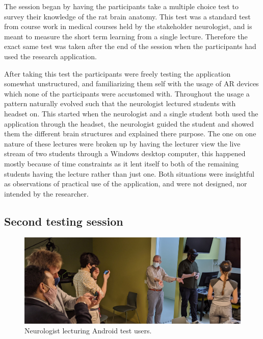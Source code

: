 The session began by having the participants take a multiple choice test to survey their knowledge of the rat brain anatomy. This test was a standard test from course work in medical courses held by the stakeholder neurologist, and is meant to measure the short term learning from a single lecture. Therefore the exact same test was taken after the end of the session when the participants had used the research application.

After taking this test the participants were freely testing the application somewhat unstructured, and familiarizing them self with the usage of AR devices which none of the participants were accustomed with. Throughout the usage a pattern naturally evolved such that the neurologist lectured students with headset on. This started when the neurologist and a single student both used the application through the headset, the neurologist guided the student and showed them the different brain structures and explained there purpose. The one on one nature of these lectures were broken up by having the lecturer view the live stream of two students through a Windows desktop computer, this happened mostly because of time constraints as it lent itself to both of the remaining students having the lecture rather than just one. 
Both situations were insightful as observations of practical use of the application, and were not designed, nor intended by the researcher. 



\subsection*{Second testing session}



\begin{figure}[ht]
    \includegraphics[width={\textwidth},trim={0 0 16cm 0},clip]{fig/usertestmennobeingmenno.jpg}
    \caption{Neurologist lecturing Android test users.}
    \label{fig:usertestmennobeingmenno}
\end{figure}


